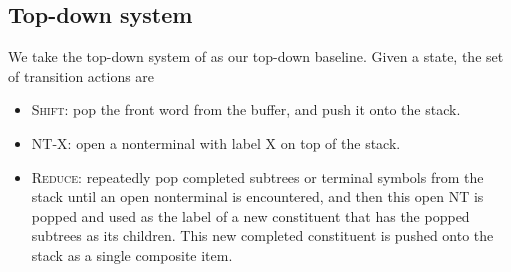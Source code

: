 \documentclass[11pt,letterpaper]{article}
\begin{document}
\subsection{Top-down system}
We take the top-down system of  as our top-down baseline.
Given a state, the set of transition actions are
\begin{itemize}
\item \textsc{Shift}: pop the front word from the buffer, and push it onto the stack.
\item \textsc{NT-X}: open a nonterminal with label X on top of the stack.
\item \textsc{Reduce}: repeatedly pop completed subtrees or terminal symbols from the stack until an open nonterminal is encountered, and then this open NT is popped and used as the label of a new constituent that has the popped subtrees as its children. This new completed constituent is pushed onto the stack as a single composite item.
\end{itemize}
\end{document}
